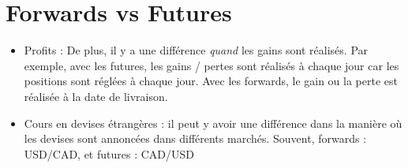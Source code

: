 \section{Forwards vs Futures}

\begin{itemize}
	\item Profits : De plus, il y a une différence \textit{quand} les gains sont réalisés. Par exemple, avec les futures, les gains / pertes sont réalisés à chaque jour car les positions sont réglées à chaque jour. Avec les forwards, le gain ou la perte est réalisée à la date de livraison. 
	\item Cours en devises étrangères : il peut y avoir une différence dans la manière où les devises sont annoncées dans différents marchés. Souvent, forwards : USD/CAD, et futures : CAD/USD
\end{itemize}

